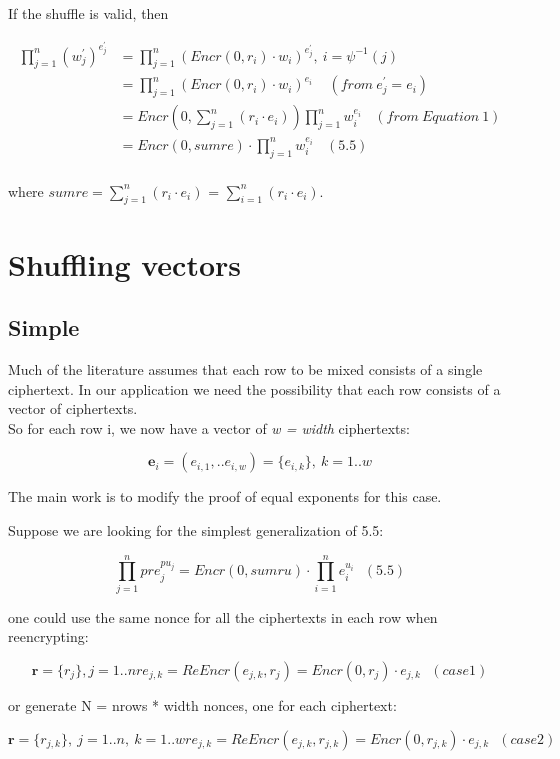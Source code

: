 \documentclass{article}
\begin{document}
If the shuffle is valid, then

\begin{align*}
\prod_{j=1}^{n}(w_{j}^{\prime})^{e_{j}^{\prime}} & =\prod_{j=1}^{n}(Encr(0,r_{i})\cdot w_{i})^{e_{j}^{\prime}},\ i=\psi^{-1}(j)\\
 & =\prod_{j=1}^{n}(Encr(0,r_{i})\cdot w_{i})^{e_{i}}\ \ \ \ \ (from\ e_{j}^{\prime}=e_{i})\\
 & =Encr(0,\sum_{j=1}^{n}(r_{i}\cdot e_{i}))\prod_{j=1}^{n}w_{i}^{e_{i}}\ \ \ \ (from\ Equation\ 1)\\
 & =Encr(0,sumre)\cdot\prod_{j=1}^{n}w_{i}^{e_{i}}\ \ \ \ (5.5)\\
\end{align*}

where $sumre=\sum_{j=1}^{n}(r_{i}\cdot e_{i})$ = $\sum_{i=1}^{n}(r_{i}\cdot e_{i})$.

\section{Shuffling vectors}

\subsection*{Simple}

Much of the literature assumes that each row to be mixed consists
of a single ciphertext. In our application we need the possibility
that each row consists of a vector of ciphertexts.\\
 So for each row i, we now have a vector of \emph{w = width} ciphertexts:

\[
\textbf{e}_{i}=(e_{i,1},..e_{i,w})=\{e_{i,k}\},\ k=1..w
\]

The main work is to modify the proof of equal exponents for this case.

Suppose we are looking for the simplest generalization of 5.5:

\[
\prod_{j=1}^{n}pre_{j}^{pu_{j}}=Encr(0,sumru)\cdot\prod_{i=1}^{n}e_{i}^{u_{i}}\ \ \ (5.5)
\]

one could use the same nonce for all the ciphertexts in each row when
reencrypting:

\[
\textbf{r}=\{r_{j}\},j=1..nre_{j,k}=ReEncr(e_{j,k},r_{j})=Encr(0,r_{j})\cdot e_{j,k}\ \ \ (case1)
\]

or generate N = nrows {*} width nonces, one for each ciphertext:

\[
\textbf{r}=\{r_{j,k}\},\ j=1..n,\ k=1..wre_{j,k}=ReEncr(e_{j,k},r_{j,k})=Encr(0,r_{j,k})\cdot e_{j,k}\ \ \ (case2)
\]
\end{document}
